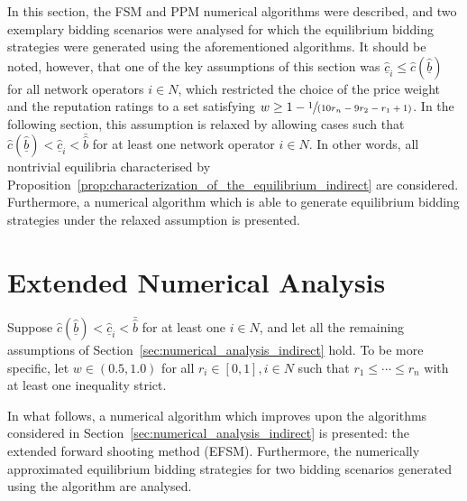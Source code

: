 In this section, the FSM and PPM numerical algorithms were described, and two exemplary bidding scenarios were analysed for which the equilibrium bidding strategies were generated using the aforementioned algorithms. It should be noted, however, that one of the key assumptions of this section was $\underline{\hat{c}}_i\leq \hat{c}(\underline{\hat{b}})$ for all network operators $i\in N$, which restricted the choice of the price weight and the reputation ratings to a set satisfying $w\geq 1 - \sfrac{1}{(10r_n - 9r_2 - r_1 + 1)}$. In the following section, this assumption is relaxed by allowing cases such that $\hat{c}(\underline{\hat{b}}) < \underline{\hat{c}}_i < \bar{\hat{b}}$ for at least one network operator $i\in N$. In other words, all nontrivial equilibria characterised by Proposition~\ref{prop:characterization_of_the_equilibrium_indirect} are considered. Furthermore, a numerical algorithm which is able to generate equilibrium bidding strategies under the relaxed assumption is presented.

\section{Extended Numerical Analysis} %
\label{sec:extended_numerical_analysis_indirect}
Suppose $\hat{c}(\underline{\hat{b}}) < \underline{\hat{c}}_i < \bar{\hat{b}}$ for at least one $i\in N$, and let all the remaining assumptions of Section~\ref{sec:numerical_analysis_indirect} hold. To be more specific, let $w\in (0.5,1.0)$ for all $r_i\in[0,1], i\in N$ such that $r_1\leq\cdots\leq r_n$ with at least one inequality strict.

In what follows, a numerical algorithm which improves upon the algorithms considered in Section~\ref{sec:numerical_analysis_indirect} is presented: the extended forward shooting method (EFSM). Furthermore, the numerically approximated equilibrium bidding strategies for two bidding scenarios generated using the algorithm are analysed. 

